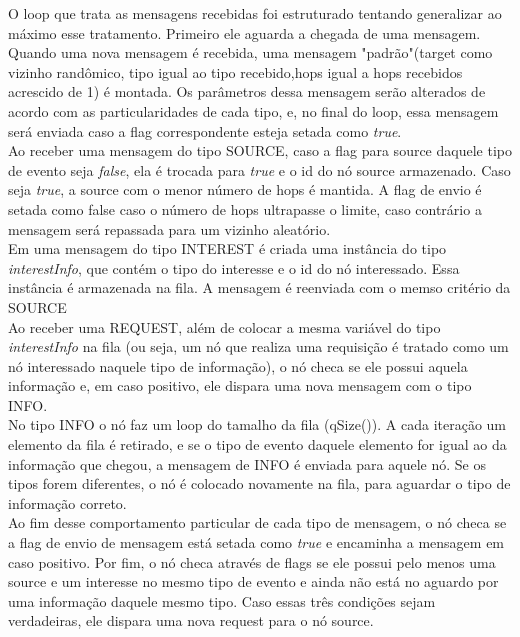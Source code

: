 \documentclass{article}
\begin{document}
		O loop que trata as mensagens recebidas foi estruturado tentando generalizar ao máximo esse tratamento. Primeiro ele aguarda a chegada de uma mensagem. Quando uma nova mensagem é recebida, uma mensagem "padrão"(target como vizinho randômico, tipo igual ao tipo recebido,hops igual a hops recebidos acrescido de 1) é montada. Os parâmetros dessa mensagem serão alterados de acordo com as particularidades de cada tipo, e, no final do loop, essa mensagem será enviada caso a flag correspondente esteja setada como \textit{true}.\\		
		
		 Ao receber uma mensagem do tipo SOURCE, caso a flag para source daquele tipo de evento seja \textit{false}, ela é trocada para \textit{true} e o id do nó source armazenado. Caso seja \textit{true}, a source com o menor número de hops é mantida. A flag de envio é setada como false caso o número de hops ultrapasse o limite, caso contrário a mensagem será repassada para um vizinho aleatório.\\
		 
		Em uma mensagem do tipo INTEREST é criada uma instância do tipo \textit{interestInfo}, que contém o tipo do interesse e o id do nó interessado. Essa instância é armazenada na fila. A mensagem é reenviada com o memso critério da SOURCE\\
		
		Ao receber uma REQUEST, além de colocar a mesma variável do tipo \textit{interestInfo} na fila (ou seja, um nó que realiza uma requisição é tratado como um nó interessado naquele tipo de informação), o nó checa se ele possui aquela informação e, em caso positivo, ele dispara uma nova mensagem com o tipo INFO.\\
		
		No tipo INFO o nó faz um loop do tamalho da fila (qSize()). A cada iteração um elemento da fila é retirado, e se o tipo de evento daquele elemento for igual ao da informação que chegou, a mensagem de INFO é enviada para aquele nó. Se os tipos forem diferentes, o nó é colocado novamente na fila, para aguardar o tipo de informação correto.\\
		
		Ao fim desse comportamento particular de cada tipo de mensagem, o nó checa se a flag de envio de mensagem está setada como \textit{true} e encaminha a mensagem em caso positivo. Por fim, o nó checa através de flags se ele possui pelo menos uma source e um interesse no mesmo tipo de evento e ainda não está no aguardo por uma informação daquele mesmo tipo. Caso essas três condições sejam verdadeiras, ele dispara uma nova request para o nó source.\\
		
\end{document}

